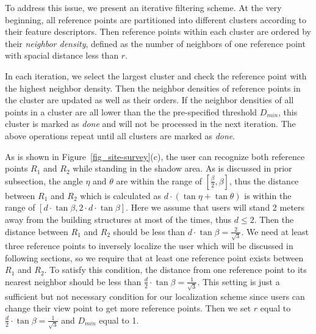 To address this issue, we present an iterative filtering scheme. At the very beginning, all reference points are partitioned into different clusters according to their feature descriptors. Then reference points within each cluster are ordered by their \emph{neighbor density}, defined as the number of neighbors of one reference point with spacial distance less than $r$.

In each iteration, we select the largest cluster and check the reference point with the highest neighbor density.
Then the neighbor densities of reference points in the cluster are updated as well as their orders. If the neighbor densities of all points in a cluster are all lower than the the pre-specified threshold $D_{min}$, this cluster is marked as \emph{done} and will not be processed in the next iteration.
The above operations repeat until all clusters are marked as \emph{done}.

As is shown in Figure~\ref{fig_site-survey}(c), the user can recognize both reference points $R_1$ and $R_2$ while standing in the shadow area. As is discussed in prior subsection, the angle $\eta$ and $\theta$ are within the range of $[\frac{\beta}{2}, \beta]$, thus the distance between $R_1$ and $R_2$ which is calculated as $d \cdot (\tan{\eta} + \tan{\theta})$ is within the range of $[d \cdot \tan{\beta}, 2 \cdot d \cdot \tan{\beta}]$. Here we assume that users will stand 2 meters away from the building structures at most of the times, thus $d \leq 2$. Then the distance between $R_1$ and $R_2$ should be less than $d \cdot \tan{\beta} = \frac{2}{\sqrt{3}}$. We need at least three reference points to inversely localize the user which will be discussed in following sections, so we require that at least one reference point exists between $R_1$ and $R_2$. To satisfy this condition, the distance from one reference point to its nearest neighbor should be less than $\frac{d}{2} \cdot \tan{\beta} = \frac{1}{\sqrt{3}}$. This setting is just a sufficient but not necessary condition for our localization scheme since users can change their view point to get more reference points. Then we set $r$ equal to $\frac{d}{2} \cdot \tan{\beta} = \frac{1}{\sqrt{3}}$ and $D_{min}$ equal to 1.




